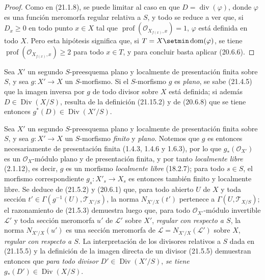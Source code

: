 \begin{proof}
Como en (21.1.8), se puede limitar al caso en que $D=\operatorname{div}(\varphi)$, donde
$\varphi$ es una función meromorfa regular relativa a $S$, y todo se reduce a ver
que, si $D_x\geq0$ en todo punto $x\in X$ tal que
$\operatorname{prof}(\mathcal O_{X_{f(x)},x})=1$, $\varphi$ está definida en todo
$X$. Pero esta hipótesis significa que, si $T=X\setmin\operatorname{dom}(\varphi)$, se tiene
$\operatorname{prof}(\mathcal O_{X_{f(x)},x})\geq2$ para todo $x\in T$, y para
concluir basta aplicar (20.6.6).
\end{proof}

\begin{env}[21.15.7]
\label{IV.21.15.7}
Sea $X'$ un segundo $S$-preesquema plano y localmente de presentación finita sobre $S$, y
sea $g:X'\to X$ un $S$-morfismo. Si el $S$-morfismo $g$ es \emph{plano}, se sabe
(21.4.5) que la imagen inversa por $g$ de todo divisor sobre $X$ está definida; si
además $D\in\operatorname{Div}(X/S)$, resulta de la definición (21.15.2) y de
(20.6.8) que se tiene entonces $g^*(D)\in\operatorname{Div}(X'/S)$.
\end{env}

\begin{env}[21.15.8]
\label{IV.21.15.8}
Sea $X'$ un segundo $S$-preesquema plano y localmente de presentación finita sobre $S$, y
sea $g:X'\to X$ un $S$-morfismo \emph{finito} y \emph{plano}. Notemos que $g$ es entonces
necesariamente de presentación finita (1.4.3, 1.4.6 y 1.6.3), por lo que
$g_*(\mathcal O_{X'})$ es un $\mathcal O_X$-módulo plano y de presentación finita, y
por tanto \emph{localmente libre} (2.1.12), es decir, $g$ es un morfismo
\emph{localmente libre} (18.2.7); para todo $s\in S$, el morfismo correspondiente
$g_s:X'_s\to X_s$ es entonces también finito y localmente libre. Se deduce de (21.5.2)
y (20.6.1) que, para todo abierto $U$ de $X$ y toda sección
$t'\in\Gamma(g^{-1}(U),\mathscr T_{X'/S})$, la norma $N_{X'/X}(t')$ pertenece a
$\Gamma(U,\mathscr T_{X/S})$; el razonamiento de (21.5.3) demuestra luego que, para todo
$\mathcal O_{X'}$-módulo invertible $\mathscr L'$ y toda sección meromorfa $u'$ de
$\mathscr L'$ sobre $X'$, \emph{regular con respecto a $S$}, la norma
$N_{X'/X}(u')$ es una sección meromorfa de
$\mathscr L=N_{X'/X}(\mathscr L')$ sobre $X$, \emph{regular con respecto a $S$}.
La interpretación de los divisores relativos a $S$ dada en (21.15.5) y la definición de
la imagen directa de un divisor (21.5.5) demuestran entonces que \emph{para todo divisor}
$D'\in\operatorname{Div}(X'/S)$, \emph{se tiene} $g_*(D')\in\operatorname{Div}(X/S)$.
\end{env}

